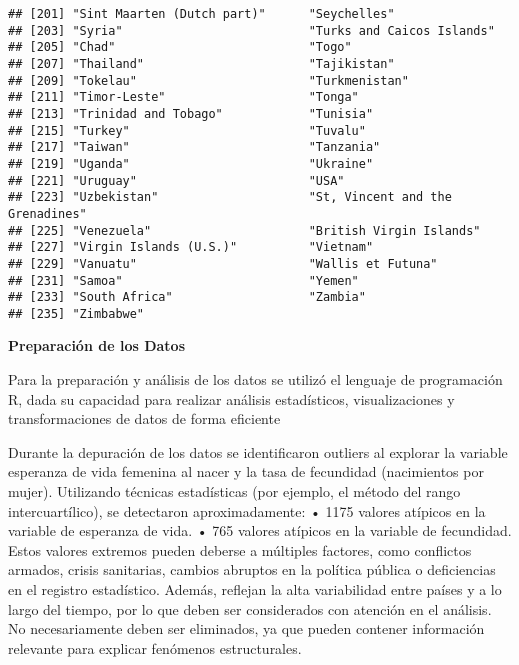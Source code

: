 \documentclass[
]{article}
\begin{document}
\begin{verbatim}
## [201] "Sint Maarten (Dutch part)"      "Seychelles"                    
## [203] "Syria"                          "Turks and Caicos Islands"      
## [205] "Chad"                           "Togo"                          
## [207] "Thailand"                       "Tajikistan"                    
## [209] "Tokelau"                        "Turkmenistan"                  
## [211] "Timor-Leste"                    "Tonga"                         
## [213] "Trinidad and Tobago"            "Tunisia"                       
## [215] "Turkey"                         "Tuvalu"                        
## [217] "Taiwan"                         "Tanzania"                      
## [219] "Uganda"                         "Ukraine"                       
## [221] "Uruguay"                        "USA"                           
## [223] "Uzbekistan"                     "St, Vincent and the Grenadines"
## [225] "Venezuela"                      "British Virgin Islands"        
## [227] "Virgin Islands (U.S.)"          "Vietnam"                       
## [229] "Vanuatu"                        "Wallis et Futuna"              
## [231] "Samoa"                          "Yemen"                         
## [233] "South Africa"                   "Zambia"                        
## [235] "Zimbabwe"
\end{verbatim}

\textbf{Preparación de los Datos}

Para la preparación y análisis de los datos se utilizó el lenguaje de
programación R, dada su capacidad para realizar análisis estadísticos,
visualizaciones y transformaciones de datos de forma eficiente

Durante la depuración de los datos se identificaron outliers al explorar
la variable esperanza de vida femenina al nacer y la tasa de fecundidad
(nacimientos por mujer). Utilizando técnicas estadísticas (por ejemplo,
el método del rango intercuartílico), se detectaron aproximadamente: •
1175 valores atípicos en la variable de esperanza de vida. • 765 valores
atípicos en la variable de fecundidad. Estos valores extremos pueden
deberse a múltiples factores, como conflictos armados, crisis
sanitarias, cambios abruptos en la política pública o deficiencias en el
registro estadístico. Además, reflejan la alta variabilidad entre países
y a lo largo del tiempo, por lo que deben ser considerados con atención
en el análisis. No necesariamente deben ser eliminados, ya que pueden
contener información relevante para explicar fenómenos estructurales.
\end{document}
